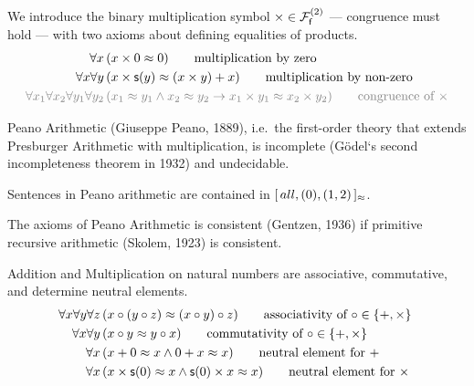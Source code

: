 \begin{definition}
	[Multiplication]\label{tab:addition:axioms}
	We introduce the binary multiplication symbol \( \times\in\mcFfn[2] \)
	--- congruence must hold ---
	with two axioms about defining equalities of products.
	\begin{align*}
	\forall x\,
	&(x\times 0 \mEQ 0)
	\tag*{multiplication by zero}\\
	\forall x\forall y\,
	&(x\times\msucc(y) \mEQ (x\times y) + x)
	\tag*{multiplication by non-zero}
	\\
	\colG\forall x_1\forall x_2\forall y_1\forall y_2\,
	&\colG (x_1\mEQ y_1\land x_2\mEQ y_2 \limp x_1\times y_1\mEQ x_2 \times y_2)
	\tag*{congruence of \( \times \)}
	\end{align*}
\end{definition}

\begin{theorem}Peano Arithmetic (Giuseppe Peano, 1889),
	i.e.\ the first-order theory that extends Presburger Arithmetic with multiplication, is incomplete (Gödel`s second incompleteness theorem in 1932) and undecidable.
\end{theorem}

\begin{remark}
	Sentences in Peano arithmetic are contained in
	\( [ \, all , (0), (1,2) \, ]{}_{\mEQ} \).
\end{remark}

\begin{theorem}
	The axioms of Peano Arithmetic is consistent (Gentzen, 1936)
	if primitive recursive arithmetic (Skolem, 1923) is consistent.
\end{theorem}

\begin{lemma}[ACN]\label{lem:acn}
	Addition and Multiplication on natural numbers are associative, commutative,
	and determine neutral elements.
	\begin{align*}
	\forall x\forall y\forall z\,&(x\circ(y\circ z) \mEQ (x\circ y)\circ z)
	\tag*{associativity of \( \circ\in \{ +,\times \} \) }
	\\
	\forall x\forall y\,&(x\circ y \mEQ y\circ x)
	\tag*{commutativity of \( \circ\in \{ +, \times \} \)}
	\\
	\forall x\,&(x + 0\mEQ x \land 0 + x \mEQ x )
	\tag*{neutral element for \( + \)}
	\\
	\forall x\,&(x \times \msucc(0)\mEQ x \land \msucc(0) \times x \mEQ x )
	\tag*{neutral element for \( \times \)}
	\end{align*}
\end{lemma}

